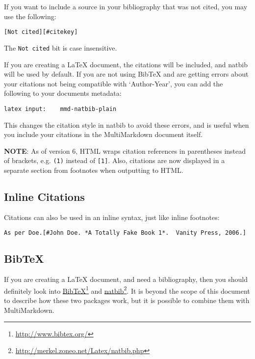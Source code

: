 If you want to include a source in your bibliography that was not cited, you may use the following:

\begin{verbatim}
[Not cited][#citekey]
\end{verbatim}

The \texttt{Not cited} bit is case insensitive.

If you are creating a LaTeX document, the citations will be included, and natbib will be used by default. If you are not using BibTeX and are getting errors about your citations not being compatible with `Author-Year', you can add the following to your documents metadata:

\begin{verbatim}
latex input:	mmd-natbib-plain
\end{verbatim}

This changes the citation style in natbib to avoid these errors, and is useful when you include your citations in the MultiMarkdown document itself.

\textbf{NOTE}: As of version 6, HTML wraps citation references in parentheses instead of brackets, e.g. \texttt{(1)} instead of \texttt{[1]}. Also, citations are now displayed in a separate section from footnotes when outputting to HTML.

\subsection{Inline Citations }
\label{inlinecitations}

Citations can also be used in an inline syntax, just like inline footnotes:

\begin{verbatim}
As per Doe.[#John Doe. *A Totally Fake Book 1*.  Vanity Press, 2006.]
\end{verbatim}

\subsection{BibTeX }
\label{bibtex}

If you are creating a LaTeX document, and need a bibliography, then you should definitely look into \href{http://www.bibtex.org/}{BibTeX}\footnote{\href{http://www.bibtex.org/}{http:\slash \slash www.bibtex.org\slash }} and \href{http://merkel.zoneo.net/Latex/natbib.php}{natbib}\footnote{\href{http://merkel.zoneo.net/Latex/natbib.php}{http:\slash \slash merkel.zoneo.net\slash Latex\slash natbib.php}}. It is beyond the scope of this document to describe how these two packages work, but it is possible to combine them with MultiMarkdown.

